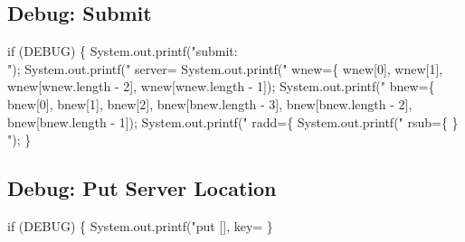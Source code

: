 \subsection{Debug: Submit}

\nwenddocs{}\endmoddef\nwstartdeflinemarkup{}\nwenddeflinemarkup
if (DEBUG) \{
  System.out.printf("submit:\\");
  System.out.printf("  server=%
  System.out.printf("  wnew=\{ %
      wnew[0], wnew[1], wnew[wnew.length - 2], wnew[wnew.length - 1]);
  System.out.printf("  bnew=\{ %
      bnew[0], bnew[1], bnew[2],
      bnew[bnew.length - 3], bnew[bnew.length - 2], bnew[bnew.length - 1]);
  System.out.printf("  radd=\{ %
  System.out.printf("  rsub=\{ \}\\");
\}
\nwendcode{}\nwdocspar

\subsection{Debug: Put Server Location}

\nwenddocs{}\endmoddef\nwstartdeflinemarkup{}\nwenddeflinemarkup
if (DEBUG) \{
  System.out.printf("put [], key=%
\}
\nwendcode{}\nwdocspar

